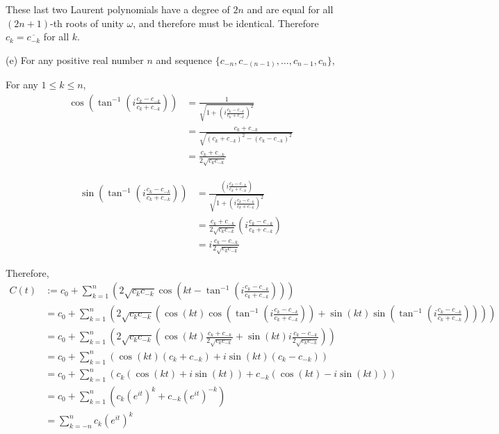 \documentclass{article}
\begin{document}
\begin{solution}
    These last two Laurent polynomials have a degree of $2n$ and are equal for all $(2n+1)$-th roots of unity $\omega$, and therefore must be identical.
    Therefore $c_k=\overline{c_{-k}}$ for all $k$.

    \pagebreak
    
    (e) For any positive real number $n$ and sequence $\{c_{-n}, c_{-(n-1)},\dots, c_{n-1}, c_n\}$,

    For any $1\leq k \leq n$,
    \begin{align*}
        \cos\left(\tan^{-1}\left(i\frac{c_k-c_{-k}}{c_k+c_{-k}}\right)\right) &= \frac{1}{\sqrt{1+\left(i\frac{c_k-c_{-k}}{c_k+c_{-k}}\right)^2}}\\
        &= \frac{c_k+c_{-k}}{\sqrt{{(c_k+c_{-k})^2-(c_k-c_{-k})^2}}}\\
        &= \frac{c_k+c_{-k}}{2\sqrt{c_kc_{-k}}}
    \end{align*}

    \begin{align*}
        \sin\left(\tan^{-1}\left(i\frac{c_k-c_{-k}}{c_k+c_{-k}}\right)\right) &= \frac{\left(i\frac{c_k-c_{-k}}{c_k+c_{-k}}\right)}{\sqrt{1+\left(i\frac{c_k-c_{-k}}{c_k+c_{-k}}\right)^2}}\\
        &= \frac{c_k+c_{-k}}{2\sqrt{c_kc_{-k}}}\left(i\frac{c_k-c_{-k}}{c_k+c_{-k}}\right)\\
        &= i\frac{c_k-c_{-k}}{2\sqrt{c_kc_{-k}}}
    \end{align*}



    Therefore,
    \begin{align*}
        C(t) &:= c_0+\sum_{k=1}^{n}\left(2\sqrt{c_kc_{-k}}\cos\left(kt-\tan^{-1}\left(i\frac{c_k-c_{-k}}{c_k+c_{-k}}\right)\right)\right) \\
        &= c_0+\sum_{k=1}^{n}\left(2\sqrt{c_kc_{-k}}\left(\cos(kt)\cos\left(\tan^{-1}\left(i\frac{c_k-c_{-k}}{c_k+c_{-k}}\right)\right) + \sin(kt)\sin\left(\tan^{-1}\left(i\frac{c_k-c_{-k}}{c_k+c_{-k}}\right)\right)\right)\right)\\
        &= c_0+\sum_{k=1}^{n}\left(2\sqrt{c_kc_{-k}}\left(\cos(kt)\frac{c_k+c_{-k}}{2\sqrt{c_kc_{-k}}} + \sin(kt)i\frac{c_k-c_{-k}}{2\sqrt{c_kc_{-k}}}\right)\right)\\
        &= c_0+\sum_{k=1}^{n}\left(\cos(kt)(c_k+c_{-k}) + i\sin(kt)(c_k-c_{-k})\right)\\
        &= c_0+\sum_{k=1}^{n}\left(c_k(\cos(kt) + i\sin(kt)) + c_{-k}(\cos(kt) - i\sin(kt))\right)\\
        &= c_0+\sum_{k=1}^{n}\left(c_k(e^{it})^k + c_{-k}(e^{it})^{-k}\right)\\
        &= \sum_{k=-n}^{n}c_k(e^{it})^k
    \end{align*}

\end{solution}
\end{document}
